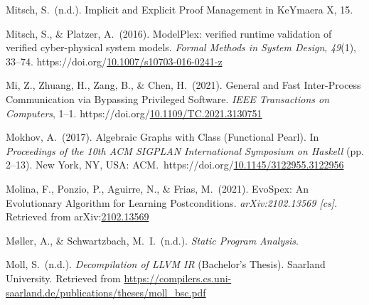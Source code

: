 \documentclass[12pt,twoside]{article}
\begin{document}
{\begin{thebibliography}{1079}
\mdbibitemlabel{}Mitsch, S.~(n.d.). Implicit and Explicit Proof Management in KeYmaera X, 15.%

\mdbibitemlabel{}Mitsch, S., \& Platzer, A.~(2016). ModelPlex: verified runtime validation of verified cyber-physical system models. \emph{Formal Methods in System Design}, \emph{49}(1), 33–74. https://doi.org/\href{https://dx.doi.org/10.1007/s10703-016-0241-z}{10.1007/s10703-016-0241-z}%

\mdbibitemlabel{}Mi, Z., Zhuang, H., Zang, B., \& Chen, H.~(2021). General and Fast Inter-Process Communication via Bypassing Privileged Software. \emph{IEEE Transactions on Computers}, 1–1. https://doi.org/\href{https://dx.doi.org/10.1109/TC.2021.3130751}{10.1109/TC.2021.3130751}%

\mdbibitemlabel{}Mokhov, A.~(2017). Algebraic Graphs with Class (Functional Pearl). In \emph{Proceedings of the 10th ACM SIGPLAN International Symposium on Haskell} (pp. 2–13). New York, NY, USA: ACM.~https://doi.org/\href{https://dx.doi.org/10.1145/3122955.3122956}{10.1145/3122955.3122956}%

\mdbibitemlabel{}Molina, F., Ponzio, P., Aguirre, N., \& Frias, M.~(2021). EvoSpex: An Evolutionary Algorithm for Learning Postconditions. \emph{arXiv:2102.13569 {}[cs]}. Retrieved from arXiv:\href{http://arxiv.org/abs/2102.13569}{2102.13569}%

\mdbibitemlabel{}Møller, A., \& Schwartzbach, M.~I.~(n.d.). \emph{Static Program Analysis}.%

\mdbibitemlabel{}Moll, S.~(n.d.). \emph{Decompilation of LLVM IR} (Bachelor’s Thesis). Saarland University. Retrieved from \href{https://compilers.cs.uni-saarland.de/publications/theses/moll_bsc.pdf}{{\ttfamily https://\hspace{0pt}compilers.\hspace{0pt}cs.\hspace{0pt}uni-\hspace{0pt}saarland.\hspace{0pt}de/\hspace{0pt}publications/\hspace{0pt}theses/\hspace{0pt}moll\_\hspace{0pt}bsc.\hspace{0pt}pdf}}%


\end{thebibliography}}
\end{document}
